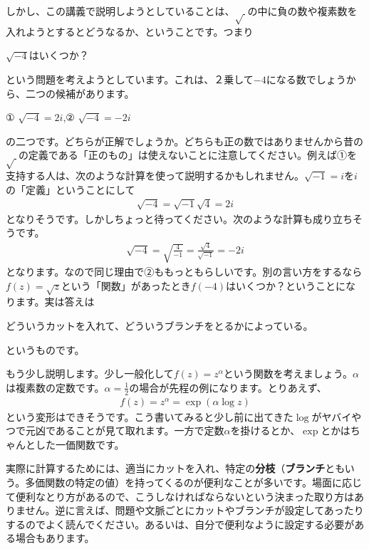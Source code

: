 \documentclass[report,paper=a4, fontsize=12pt, line_length=16cm, number_of_lines=33,dvipdfmx]{jlreq}
\newenvironment{myquote}{\begin{tcolorbox}[
  colback = blue!5, after = \noindent] }{\end{tcolorbox}}
\numberwithin{equation}{section}
\newcommand{\strong}[1]{\textsf{\bfseries #1}}
\begin{document}
しかし、この講義で説明しようとしていることは、$\sqrt{\ }$の中に負の数や複素数を入れようとするとどうなるか、ということです。つまり
\begin{myquote}
  $\sqrt{-4}$はいくつか？
\end{myquote}
という問題を考えようとしています。これは、２乗して$-4$になる数でしょうから、二つの候補があります。
\begin{myquote}
  ① $\sqrt{-4}=2i$,\qquad ② $\sqrt{-4}=-2i$
\end{myquote}
の二つです。どちらが正解でしょうか。どちらも正の数ではありませんから昔の$\sqrt{\ }$の定義である「正のもの」は使えないことに注意してください。例えば①を支持する人は、次のような計算を使って説明するかもしれません。$\sqrt{-1}=i$を$i$の「定義」ということにして
\begin{align}
  \sqrt{-4}=\sqrt{-1}\sqrt{4}=2i
\end{align}
となりそうです。しかしちょっと待ってください。次のような計算も成り立ちそうです。
\begin{align}
  \sqrt{-4}=\sqrt{\frac{4}{-1}}=\frac{\sqrt{4}}{\sqrt{-1}}=-2i
\end{align}
となります。なので同じ理由で②ももっともらしいです。別の言い方をするなら
$f(z)=\sqrt{z}$という「関数」があったとき$f(-4)$はいくつか？ということになります。実は答えは
\begin{myquote}
  どういうカットを入れて、どういうブランチをとるかによっている。
\end{myquote}
というものです。

もう少し説明します。少し一般化して$f(z)=z^{\alpha}$という関数を考えましょう。$\alpha$は複素数の定数です。$\alpha=\frac12$の場合が先程の例になります。とりあえず、
\begin{align}
  f(z)=z^{\alpha}=\exp(\alpha\log z)\label{powerfunction}
\end{align}
という変形はできそうです。こう書いてみると少し前に出てきた$\log$がヤバイやつで元凶であることが見て取れます。一方で定数$\alpha$を掛けるとか、$\exp$とかはちゃんとした一価関数です。

実際に計算するためには、適当にカットを入れ、特定の\strong{分枝}（\strong{ブランチ}ともいう。多価関数の特定の値）を持ってくるのが便利なことが多いです。場面に応じて便利なとり方があるので、こうしなければならないという決まった取り方はありません。逆に言えば、問題や文脈ごとにカットやブランチが設定してあったりするのでよく読んでください。あるいは、自分で便利なように設定する必要がある場合もあります。
\end{document}
